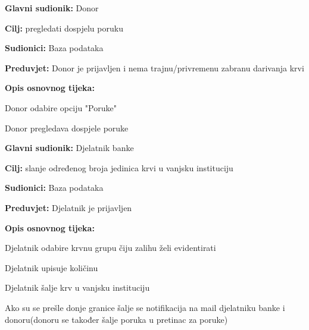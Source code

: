 \noindent {}
					\begin{packed_item}
	
						\item \textbf{Glavni sudionik: }Donor
						\item \textbf{Cilj:} pregledati dospjelu poruku
						\item \textbf{Sudionici:} Baza podataka
						\item \textbf{Preduvjet:} Donor je prijavljen i nema trajnu/privremenu zabranu darivanja krvi
						\item \textbf{Opis osnovnog tijeka:}
						
						\item[] \begin{packed_enum}
	
							\item Donor odabire opciju "Poruke"
							\item Donor pregledava dospjele poruke
							
						\end{packed_enum}

					\end{packed_item}


\noindent {}
					\begin{packed_item}
	
						\item \textbf{Glavni sudionik: }Djelatnik banke
						\item \textbf{Cilj:} slanje određenog broja jedinica krvi u vanjsku instituciju
						\item \textbf{Sudionici:} Baza podataka
						\item \textbf{Preduvjet:} Djelatnik je prijavljen
						\item \textbf{Opis osnovnog tijeka:}
						
						\item[] \begin{packed_enum}
	
							\item Djelatnik odabire krvnu grupu čiju zalihu želi evidentirati
							\item Djelatnik upisuje količinu
							\item Djelatnik šalje krv u vanjsku instituciju
							\item {Ako su se prešle donje granice šalje se notifikacija na mail djelatniku banke i donoru(donoru se također šalje poruka u pretinac za poruke)}
						\end{packed_enum}
									
					\end{packed_item}
				

